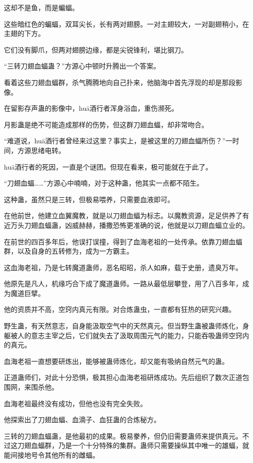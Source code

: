 \begin{this_body}
这却不是鱼，而是蝙蝠。

这些暗红色的蝙蝠，双耳尖长，长有两对翅膀。一对主翅较大，一对副翅稍小，在主翅的下方。

它们没有脚爪，但两对翅膀边缘，都是尖锐锋利，堪比钢刀。

“三转刀翅血蝠蛊？”方源心中顿时升腾出一个答案。

看着这些刀翅血蝠群，杀气腾腾地向自己扑来，他脑海中首先浮现的却是那段影像。

在留影存声蛊的影像中，huā酒行者浑身浴血，重伤濒死。

月影蛊是绝不可能造成那样的伤势，但这群刀翅血蝠，却非常吻合。

“难道说，huā酒行者曾经来过这里？事实上，是被这里的刀翅血蝠所伤？”一时间，方源思绪电转。

huā酒行者的死因，一直是个谜团。但现在看来，极可能就在于此了。

“刀翅血蝠……”方源心中喃喃，对于这种蛊，他其实一点都不陌生。

这种蛊，虽然只是三转，但极易喂养，只需要血液即可。

在他前世，他建立血翼魔教，就是以刀翅血蝠为标志。以魔教资源，足足供养了有近万头刀翅血蝠蛊，凶威赫赫，播撒恐怖更准确的说，他就是以刀翅血蝠立业的。

在前世的四百多年后，他误打误撞，得到了血海老祖的一处传承。依靠刀翅血蝠群，以及自身的五转修为，成为一方霸主。

这血海老祖，乃是七转魔道蛊师，恶名昭昭，杀人如麻，载于史册，遗臭万年。

他原先是凡人，机缘巧合下成了魔道蛊师。一路从最低层攀登，用了八百多年，成为魔道巨擘。

他的资质并不高，空窍内真元有限。对合炼蛊虫，一直都有狂热的研究兴趣。

野生蛊，有天然意志，自身能汲取空气中的天然真元。但当野生蛊被蛊师炼化，身躯被人的意志主宰之后，它们就失去了汲取周围元气的能力，只能吞吸蛊师空窍内的真元。

血海老祖一直想要研炼出，能够被蛊师炼化，却又能有吸纳自然元气的蛊。

正道蛊师们，对此十分恐惧，极其担心血海老祖研炼成功。先后组织了数次正道包围网，来围杀他。

血海老祖最终没有成功，但他也没有完全失败。

他探索出了刀翅血蝠、血滴子、血狂蛊的合炼秘方。

三转的刀翅血蝠蛊，是他最初的成果。极易豢养，但仍旧需要蛊师来提供真元。不过这刀翅血蝠群，乃是一个十分特殊的集群。蛊师只需要操纵其中唯一的雄蝠，就能间接地号令其他所有的雌蝠。


\end{this_body}
